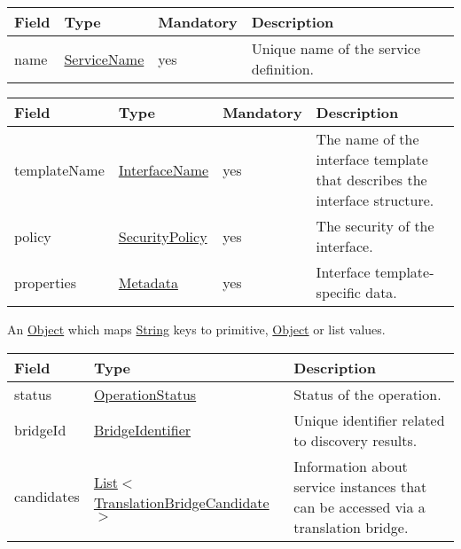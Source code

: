 \documentclass[a4paper]{arrowhead}
\newcommand{\pref}[1]{{\textcolor{ArrowheadGrey}{\hyperref[sec:model:primitives:#1]{#1}}}}
\begin{document}
\begin{table}[ht!]
\begin{tabularx}{\textwidth}{| p{3.9cm} | p{4cm} | p{2cm} | X |} \hline
\rowcolor{gray!33} Field & Type & Mandatory & Description \\ \hline
name & \pref{ServiceName} & yes & Unique name of the service definition. \\ \hline
\end{tabularx}
\end{table}


\begin{table}[ht!]
\begin{tabularx}{\textwidth}{| p{3.9cm} | p{4cm} | p{2cm} | X |} \hline
\rowcolor{gray!33} Field & Type & Mandatory & Description \\ \hline
templateName & \pref{InterfaceName} & yes & The name of the interface template that describes the interface structure. \\ \hline
policy & \pref{SecurityPolicy} & yes & The security of the interface. \\ \hline
properties &\hyperref[sec:model:Metadata]{Metadata} & yes & Interface template-specific data. \\ \hline
\end{tabularx}
\end{table}


An \pref{Object} which maps \pref{String} keys to primitive, \pref{Object} or list values.


\begin{table}[ht!]
\begin{tabularx}{\textwidth}{| p{4.25cm} | p{6.1cm} | X |} \hline
\rowcolor{gray!33} Field & Type      & Description \\ \hline
status & \pref{OperationStatus} & Status of the operation. \\ \hline
bridgeId & \pref{BridgeIdentifier} & Unique identifier related to discovery results. \\ \hline
candidates & \pref{List}$<$\hyperref[sec:model:TranslationBridgeCandidate]{TranslationBridgeCandidate}$>$ & Information about service instances that can be accessed via a translation bridge. \\ \hline
\end{tabularx}
\end{table}
\end{document}
